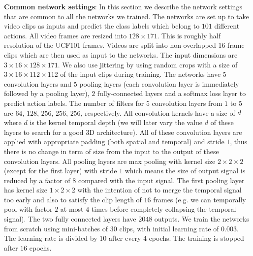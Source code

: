 \documentclass[10pt,twocolumn,letterpaper]{article}
\begin{document}
{\bf Common network settings}: In this section we describe the network settings that are common to all the networks we trained. The networks are set up to take video clips as inputs and predict the class labels which belong to $101$ different actions. All video frames are resized into $128 \times 171$. This is roughly half resolution of the UCF101 frames. Videos are split into non-overlapped 16-frame clips which are then used as input to the networks. The input dimensions are $3 \times 16 \times 128 \times 171$. We also use jittering by using random crops with a size of $3 \times 16 \times 112 \times 112$ of the input clips during training. The networks have $5$ convolution layers and $5$ pooling layers (each convolution layer is immediately followed by a pooling layer), $2$ fully-connected layers and a softmax loss layer to predict action labels. The number of filters for $5$ convolution layers from $1$ to $5$ are $64$, $128$, $256$, $256$, $256$, respectively. All convolution kernels have a size of $d \time 3 \time 3$ where $d$ is the kernel temporal depth (we will later vary the value $d$ of these layers to search for a good $3$D architecture). All of these convolution layers are applied with appropriate padding (both spatial and temporal) and stride $1$, thus there is no change in term of size from the input to the output of these convolution layers. All pooling layers are max pooling with kernel size $2 \times 2 \times 2$ (except for the first layer) with stride $1$ which means the size of output signal is reduced by a factor of $8$ compared with the input signal. The first pooling layer has kernel size $1 \times 2 \times 2$ with the intention of not to merge the temporal signal too early and also to satisfy the clip length of $16$ frames (e.g. we can temporally pool with factor $2$ at most $4$ times before completely collapsing the temporal signal). The two fully connected layers have $2048$ outputs. We train the networks from scratch using mini-batches of $30$ clips, with initial learning rate of $0.003$. The learning rate is divided by $10$ after every $4$ epochs. The training is stopped after $16$ epochs.
\end{document}
